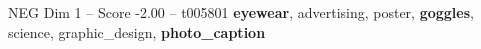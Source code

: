 \begin{textsample}{NEG Dim 1 – Score -2.00 – t005801}  \label{ex:f1_neg_009}
\textbf{eyewear}, advertising, poster, \textbf{goggles}, science, graphic\_design, \textbf{photo\_caption}

\end{textsample}
